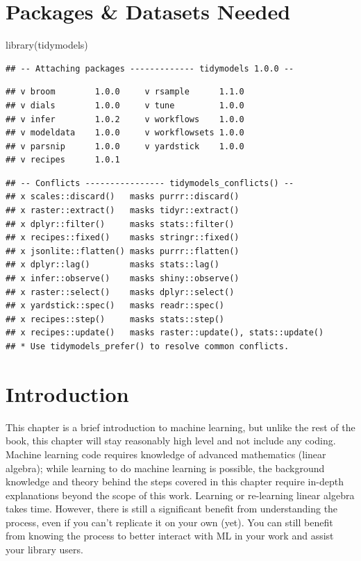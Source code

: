 \documentclass[
  krantz2]{krantz}
\makeatletter
\newenvironment{Shaded}{\begin{snugshade}}{\end{snugshade}}
\newcommand{\FunctionTok}[1]{\textcolor[rgb]{0,0,0}{#1}}
\newcommand{\NormalTok}[1]{#1}
\newenvironment{kframe}{%
\medskip{}
\setlength{\fboxsep}{.8em}
 \def\at@end@of@kframe{}%
 \ifinner\ifhmode%
  \def\at@end@of@kframe{\end{minipage}}%
  \begin{minipage}{\columnwidth}%
 \fi\fi%
 \def\FrameCommand##1{\hskip\@totalleftmargin \hskip-\fboxsep
 \colorbox{shadecolor}{##1}\hskip-\fboxsep
     \hskip-\linewidth \hskip-\@totalleftmargin \hskip\columnwidth}%
 \MakeFramed {\advance\hsize-\width
   \@totalleftmargin\z@ \linewidth\hsize
   \@setminipage}}%
 {\par\unskip\endMakeFramed%
 \at@end@of@kframe}
\renewenvironment{Shaded}{\begin{kframe}}{\end{kframe}}
\makeatother
\begin{document}
\hypertarget{ml-pkgs}{%
\section{Packages \& Datasets Needed}\label{ml-pkgs}}

\begin{Shaded}
\begin{Highlighting}[]
\FunctionTok{library}\NormalTok{(tidymodels)}
\end{Highlighting}
\end{Shaded}

\begin{verbatim}
## -- Attaching packages ------------- tidymodels 1.0.0 --
\end{verbatim}

\begin{verbatim}
## v broom        1.0.0     v rsample      1.1.0
## v dials        1.0.0     v tune         1.0.0
## v infer        1.0.2     v workflows    1.0.0
## v modeldata    1.0.0     v workflowsets 1.0.0
## v parsnip      1.0.0     v yardstick    1.0.0
## v recipes      1.0.1
\end{verbatim}

\begin{verbatim}
## -- Conflicts ---------------- tidymodels_conflicts() --
## x scales::discard()   masks purrr::discard()
## x raster::extract()   masks tidyr::extract()
## x dplyr::filter()     masks stats::filter()
## x recipes::fixed()    masks stringr::fixed()
## x jsonlite::flatten() masks purrr::flatten()
## x dplyr::lag()        masks stats::lag()
## x infer::observe()    masks shiny::observe()
## x raster::select()    masks dplyr::select()
## x yardstick::spec()   masks readr::spec()
## x recipes::step()     masks stats::step()
## x recipes::update()   masks raster::update(), stats::update()
## * Use tidymodels_prefer() to resolve common conflicts.
\end{verbatim}

\hypertarget{ml-intro}{%
\section{Introduction}\label{ml-intro}}

This chapter is a brief introduction to machine learning, but unlike the rest of the book, this chapter will stay reasonably high level and not include any coding. Machine learning code requires knowledge of advanced mathematics (linear algebra); while learning to do machine learning is possible, the background knowledge and theory behind the steps covered in this chapter require in-depth explanations beyond the scope of this work. Learning or re-learning linear algebra takes time. However, there is still a significant benefit from understanding the process, even if you can't replicate it on your own (yet). You can still benefit from knowing the process to better interact with ML in your work and assist your library users.
\end{document}
